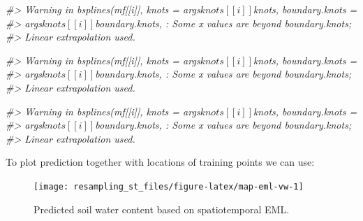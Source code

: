 \documentclass[
  graybox,natbib,nospthms]{svmono}
\newenvironment{Shaded}{\begin{snugshade}}{\end{snugshade}}
\newcommand{\AttributeTok}[1]{\textcolor[rgb]{0.61,0.61,0.61}{#1}}
\newcommand{\CommentTok}[1]{\textcolor[rgb]{0.37,0.37,0.37}{\textit{#1}}}
\newcommand{\ConstantTok}[1]{\textcolor[rgb]{0,0,0}{#1}}
\newcommand{\DecValTok}[1]{\textcolor[rgb]{0.06,0.06,0.06}{#1}}
\newcommand{\FunctionTok}[1]{\textcolor[rgb]{0,0,0}{#1}}
\newcommand{\NormalTok}[1]{#1}
\newcommand{\OtherTok}[1]{\textcolor[rgb]{0.37,0.37,0.37}{#1}}
\newcommand{\SpecialCharTok}[1]{\textcolor[rgb]{0,0,0}{#1}}
\newcommand{\StringTok}[1]{\textcolor[rgb]{0.5,0.5,0.5}{#1}}
\begin{document}
\begin{Shaded}
\begin{Highlighting}[]
\CommentTok{\#\textgreater{} Warning in bsplines(mf[[i]], knots = args$knots[[i]]$knots, boundary.knots =}
\CommentTok{\#\textgreater{} args$knots[[i]]$boundary.knots, : Some \textquotesingle{}x\textquotesingle{} values are beyond \textquotesingle{}boundary.knots\textquotesingle{};}
\CommentTok{\#\textgreater{} Linear extrapolation used.}

\CommentTok{\#\textgreater{} Warning in bsplines(mf[[i]], knots = args$knots[[i]]$knots, boundary.knots =}
\CommentTok{\#\textgreater{} args$knots[[i]]$boundary.knots, : Some \textquotesingle{}x\textquotesingle{} values are beyond \textquotesingle{}boundary.knots\textquotesingle{};}
\CommentTok{\#\textgreater{} Linear extrapolation used.}

\CommentTok{\#\textgreater{} Warning in bsplines(mf[[i]], knots = args$knots[[i]]$knots, boundary.knots =}
\CommentTok{\#\textgreater{} args$knots[[i]]$boundary.knots, : Some \textquotesingle{}x\textquotesingle{} values are beyond \textquotesingle{}boundary.knots\textquotesingle{};}
\CommentTok{\#\textgreater{} Linear extrapolation used.}
\end{Highlighting}
\end{Shaded}

To plot prediction together with locations of training points we can
use:

\begin{Shaded}
\end{Shaded}

\begin{figure}

{\centering \texttt{[image: resampling\_st\_files/figure-latex/map-eml-vw-1]} 

}

\caption{Predicted soil water content based on spatiotemporal EML.}\label{fig:map-eml-vw}
\end{figure}
\end{document}
